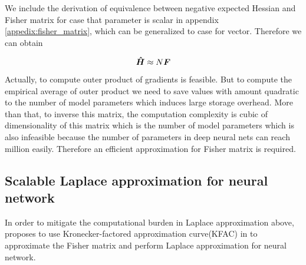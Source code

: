 We include the derivation of equivalence between negative expected Hessian and Fisher matrix for case that parameter is scalar in appendix \ref{appedix:fisher_matrix}, which can be generalized to case for vector.
Therefore we can obtain 

\begin{equation} \label{fisher hessian}
\boldsymbol{\hat H} \approx N\boldsymbol F
\end{equation}

Actually, to compute outer product of gradients is feasible. But to compute the empirical average of outer product we need to save values with amount quadratic to the number of model parameters which induces large storage overhead. More than that, to inverse this matrix, the computation complexity is cubic of dimensionality of this matrix which is the number of model parameters which is also infeasible because the number of parameters in deep neural nets can reach million easily. Therefore an efficient approximation for Fisher matrix is required. 

\subsection{Scalable Laplace approximation for neural network}
In order to mitigate the computational burden in Laplace approximation above, \cite{ritter2018scalable} proposes to use Kronecker-factored approximation curve(KFAC) in \cite{martens2015optimizing} to approximate the Fisher matrix and perform Laplace approximation for neural network.


